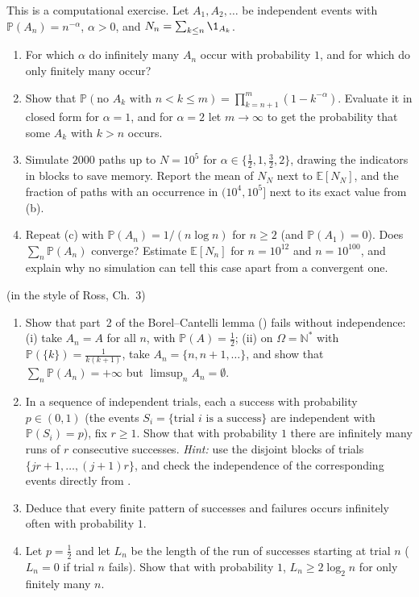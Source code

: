 \begin{exercise}\label{ex:ms-borel-cantelli-sim}
\medium This is a computational exercise. Let $A_1,A_2,\dots$ be independent events with
$\mathbb P(A_n)=n^{-\alpha}$, $\alpha>0$, and $N_n=\sum_{k\le n}\1_{A_k}$.
\begin{enumerate}[label=(\alph*)]
  \item For which $\alpha$ do infinitely many $A_n$ occur with probability $1$, and for which
    do only finitely many occur?
  \item Show that $\mathbb P(\text{no }A_k\text{ with }n<k\le m)=\prod_{k=n+1}^m(1-k^{-\alpha})$.
    Evaluate it in closed form for $\alpha=1$, and for $\alpha=2$ let $m\to\infty$ to get
    the probability that some $A_k$ with $k>n$ occurs.
  \item Simulate $2000$ paths up to $N=10^5$ for $\alpha\in\{\frac12,1,\frac32,2\}$, drawing
    the indicators in blocks to save memory. Report the mean of $N_N$ next to
    $\mathbb E[N_N]$, and the fraction of paths with an occurrence in $(10^4,10^5]$ next to its
    exact value from (b).
  \item Repeat (c) with $\mathbb P(A_n)=1/(n\log n)$ for $n\ge2$ (and $\mathbb P(A_1)=0$). Does
    $\sum_n\mathbb P(A_n)$ converge? Estimate $\mathbb E[N_n]$ for $n=10^{12}$ and $n=10^{100}$,
    and explain why no simulation can tell this case apart from a convergent one.
\end{enumerate}
\end{exercise}

\begin{exercise}\label{ex:ms-bc-independence}
\medium (in the style of Ross, Ch.~3)
\begin{enumerate}[label=(\alph*)]
  \item Show that part~2 of the Borel--Cantelli lemma ()
    fails without independence: (i) take $A_n=A$ for all $n$, with $\mathbb P(A)=\frac12$;
    (ii) on $\Omega=\mathbb N^*$ with $\mathbb P(\{k\})=\frac1{k(k+1)}$, take
    $A_n=\{n,n+1,\dots\}$, and show that $\sum_n\mathbb P(A_n)=+\infty$ but
    $\limsup_nA_n=\emptyset$.
  \item In a sequence of independent trials, each a success with probability $p\in(0,1)$
    (the events $S_i=\{\text{trial }i\text{ is a success}\}$ are independent with
    $\mathbb P(S_i)=p$), fix $r\ge1$. Show that with probability $1$ there are infinitely many
    runs of $r$ consecutive successes. \emph{Hint:} use the disjoint blocks of trials
    $\{jr+1,\dots,(j+1)r\}$, and check the independence of the corresponding events directly
    from .
  \item Deduce that every finite pattern of successes and failures occurs infinitely often
    with probability $1$.
  \item Let $p=\frac12$ and let $L_n$ be the length of the run of successes starting at trial
    $n$ ($L_n=0$ if trial $n$ fails). Show that with probability $1$, $L_n\ge2\log_2n$ for
    only finitely many $n$.
\end{enumerate}
\end{exercise}
